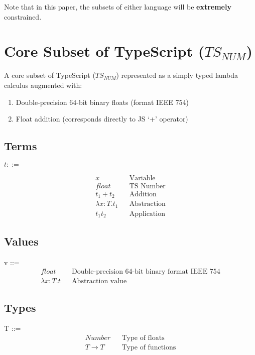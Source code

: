 \documentclass{article}
\begin{document}
	Note that in this paper, the subsets of either language will be \textbf{extremely} constrained.
	
	\section{Core Subset of TypeScript ($TS_{NUM}$)}
	
	A core subset of TypeScript ($TS_{NUM}$) represented as a simply typed lambda calculus augmented with:
	\begin{enumerate}
		\item Double-precision 64-bit binary floats (format IEEE 754)
		\item Float addition (corresponds directly to JS `+' operator)
	\end{enumerate}
	
	\subsection{Terms}
	$t ::=$
	
	\begin{align*}
		x											&& \text{Variable}\\
		float  										&& \text{TS Number} \\
		t_1 + t_2 									&& \text{Addition} \\
		\lambda x\colon T.t_1						&& \text{Abstraction} \\
		t_1 t_2										&& \text{Application}
	\end{align*}


	\subsection{Values}
	v ::=
	\begin{align*}
		float										&& \text{Double-precision 64-bit binary format IEEE 754} \\
		\lambda x\colon T.t							&& \text{Abstraction value}
	\end{align*}
	
	
	\subsection{Types}
	T ::=
	\begin{align*}
		Number												&& \text{Type of floats}\\
		T \rightarrow T										&& \text{Type of functions}
	\end{align*}
	
\end{document}
